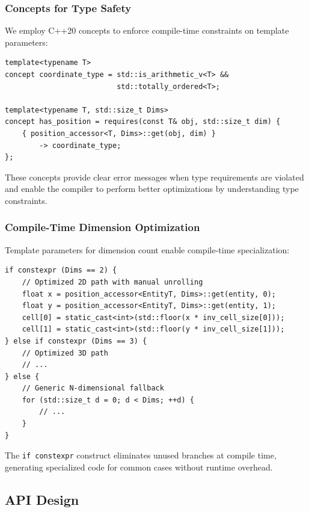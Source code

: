 \documentclass[11pt]{article}
\begin{document}
\subsubsection{Concepts for Type Safety}

We employ C++20 concepts to enforce compile-time constraints on template parameters:

\begin{lstlisting}[caption={Core concepts for type constraints}]
template<typename T>
concept coordinate_type = std::is_arithmetic_v<T> &&
                          std::totally_ordered<T>;

template<typename T, std::size_t Dims>
concept has_position = requires(const T& obj, std::size_t dim) {
    { position_accessor<T, Dims>::get(obj, dim) }
        -> coordinate_type;
};
\end{lstlisting}

These concepts provide clear error messages when type requirements are violated and enable the compiler to perform better optimizations by understanding type constraints.

\subsubsection{Compile-Time Dimension Optimization}

Template parameters for dimension count enable compile-time specialization:

\begin{lstlisting}[caption={Dimension-specific optimization example}]
if constexpr (Dims == 2) {
    // Optimized 2D path with manual unrolling
    float x = position_accessor<EntityT, Dims>::get(entity, 0);
    float y = position_accessor<EntityT, Dims>::get(entity, 1);
    cell[0] = static_cast<int>(std::floor(x * inv_cell_size[0]));
    cell[1] = static_cast<int>(std::floor(y * inv_cell_size[1]));
} else if constexpr (Dims == 3) {
    // Optimized 3D path
    // ...
} else {
    // Generic N-dimensional fallback
    for (std::size_t d = 0; d < Dims; ++d) {
        // ...
    }
}
\end{lstlisting}

The \texttt{if constexpr} construct eliminates unused branches at compile time, generating specialized code for common cases without runtime overhead.

\subsection{API Design}
\end{document}

